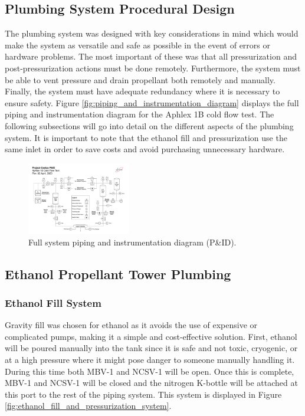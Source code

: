 \documentclass[9pt]{article} %
\numberwithin{equation}{section} %
\begin{document}
\subsection{Plumbing System Procedural Design}
The plumbing system was designed with key considerations in mind which would make the system as versatile and safe as possible in the event of errors or hardware problems. The most important of these was that all pressurization and post-pressurization actions must be done remotely. Furthermore, the system must be able to vent pressure and drain propellant both remotely and manually. Finally, the system must have adequate redundancy where it is necessary to ensure safety. Figure \ref{fig:piping_and_instrumentation_diagram} displays the full piping and instrumentation diagram for the Aphlex 1B cold flow test. The following subsections will go into detail on the different aspects of the plumbing system. It is important to note that the ethanol fill and pressurization use the same inlet in order to save costs and avoid purchasing unnecessary hardware.

\begin{figure}[!htb]
    \centering
    \includegraphics[scale=0.5, width=0.4\textwidth, trim={0cm 0cm 0cm 5cm}, clip]{Aphlex1B_04-02-2020_P&ID.pdf} %
    \caption{Full system piping and instrumentation diagram (P\&ID).}
    \label{fig:pid_2}
\end{figure}

\subsection{Ethanol Propellant Tower Plumbing}

\subsubsection{Ethanol Fill System}
\hspace{\parindent} Gravity fill was chosen for ethanol as it avoids the use of expensive or complicated pumps, making it a simple and cost-effective solution. First, ethanol will be poured manually into the tank since it is safe and not toxic, cryogenic, or at a high pressure where it might pose danger to someone manually handling it. During this time both MBV-1 and NCSV-1 will be open. Once this is complete, MBV-1 and NCSV-1 will be closed and the nitrogen K-bottle will be attached at this port to the rest of the piping system. This system is displayed in Figure \ref{fig:ethanol_fill_and_pressurization_system}.
\end{document}
